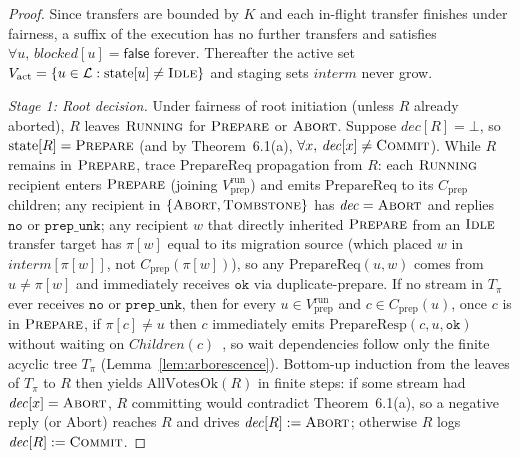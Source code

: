 \documentclass[sigconf,nonacm]{acmart}
\newcommand{\stIdle}{\textsc{Idle}}
\newcommand{\stRun}{\textsc{Running}}
\newcommand{\stPrep}{\textsc{Prepare}}
\newcommand{\stCom}{\textsc{Commit}}
\newcommand{\stAbt}{\textsc{Abort}}
\newcommand{\stTomb}{\textsc{Tombstone}}
\newcommand{\Children}{\mathit{Children}}
\newcommand{\interm}{\mathit{interm}}
\newcommand{\dec}{\mathit{dec}}
\newcommand{\blocked}{\mathit{blocked}}
\begin{document}
\begin{proof}
Since transfers are bounded by \(K\) and each in-flight transfer finishes
under fairness, a suffix of the execution has no further transfers and
satisfies \(\forall u,\, \blocked[u] = \mathsf{false}\) forever. Thereafter
the active set \(V_{\mathrm{act}} = \{u \in \mathcal{L} : \mathrm{state}[u]
\neq \stIdle\}\) and staging sets \(\interm\) never grow.

\emph{Stage 1: Root decision.} Under fairness of root initiation (unless
\(R\) already aborted), \(R\) leaves \(\stRun\) for \(\stPrep\) or \(\stAbt\).
Suppose \(\dec[R] = \bot\), so \(\mathrm{state}[R] = \stPrep\) (and by
Theorem~6.1(a), \(\forall x,\, \dec[x] \neq \stCom\)). While \(R\) remains in
\(\stPrep\), trace \(\mathrm{PrepareReq}\) propagation from \(R\): each
\(\stRun\) recipient enters \(\stPrep\) (joining \(V_{\mathrm{prep}}^{\mathrm{run}}\))
and emits \(\mathrm{PrepareReq}\) to its \(C_{\mathrm{prep}}\) children; any
recipient in \(\{\stAbt,\allowbreak \stTomb\}\) has \(\dec = \stAbt\) and
replies \(\mathtt{no}\) or \(\mathtt{prep\_unk}\); any recipient \(w\) that
directly inherited \(\stPrep\) from an \(\stIdle\) transfer target has
\(\pi[w]\) equal to its migration source (which placed \(w\) in
\(\interm[\pi[w]]\), not \(C_{\mathrm{prep}}(\pi[w])\)), so any
\(\mathrm{PrepareReq}(u, w)\) comes from \(u \neq \pi[w]\) and immediately
receives \(\mathtt{ok}\) via duplicate-prepare. If no stream in \(T_\pi\)
ever receives \(\mathtt{no}\) or \(\mathtt{prep\_unk}\), then for every
\(u \in V_{\mathrm{prep}}^{\mathrm{run}}\) and \(c \in C_{\mathrm{prep}}(u)\),
once \(c\) is in \(\stPrep\), if \(\pi[c] \neq u\) then \(c\) immediately
emits \(\mathrm{PrepareResp}(c, u, \mathtt{ok})\) without waiting on
\(\Children(c)\)~\cite[\S4.6]{tree2pc}, so wait dependencies follow only the
finite acyclic tree \(T_\pi\) (Lemma~\ref{lem:arborescence}). Bottom-up
induction from the leaves of \(T_\pi\) to \(R\) then yields
\(\mathrm{AllVotesOk}(R)\) in finite steps: if some stream had \(\dec[x] =
\stAbt\), \(R\) committing would contradict Theorem~6.1(a), so a negative
reply (or \(\mathrm{Abort}\)) reaches \(R\) and drives \(\dec[R] := \stAbt\);
otherwise \(R\) logs \(\dec[R] := \stCom\).


\end{proof}
\end{document}
